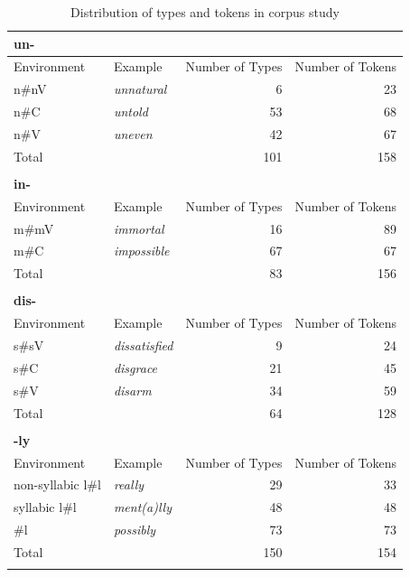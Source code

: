 \begin{table}
	\caption{Distribution of types and tokens in corpus study}
	\label{tbl:distribution of types and tokens in corpus}
	
		
		\begin{tabular} {llrr}
				\lsptoprule	
			\textbf{un-}&&&\\
						\midrule   	
			Environment & Example & Number of Types & Number of Tokens\\
			\midrule
			n\#nV&\color{lsMidBlue}\textit{unnatural} & 6 & 23\\ 
			n\#C&\color{lsMidBlue}\textit{untold} & 53 & 68\\ 
			n\#V&\color{lsMidBlue}\textit{uneven} & 42 & 67\\
			\midrule
			Total&  & 101 & 158\\ 
			\midrule
			\\
			\textbf{in-}&&&\\
						\midrule   	
			Environment & Example & Number of Types & Number of Tokens\\
			\midrule
			m\#mV&\color{lsMidBlue}\textit{immortal} & 16 & 89\\ 
			m\#C&\color{lsMidBlue}\textit{impossible} & 67 & 67\\ 
			\midrule   
			Total&  & 83 & 156\\ 
			\midrule     	
			\\
			\textbf{dis-}&&&\\
									\midrule   	
			Environment & Example & Number of Types & Number of Tokens\\
			\midrule
			s\#sV&\color{lsMidBlue}\textit{dissatisfied} & 9 & 24\\ 
			s\#C&\color{lsMidBlue}\textit{disgrace} & 21 & 45\\ 
			s\#V&\color{lsMidBlue}\textit{disarm} & 34 & 59\\ 
			\midrule   	
			Total&  & 64 & 128\\ 
			\midrule   	
			\\
			\textbf{-ly}&&&\\
						\midrule   	
			Environment & Example & Number of Types & Number of Tokens\\
			\midrule
			non-\is{syllabicity}syllabic l\#l &\color{lsMidBlue}\textit{really} & 29  & 33 \\ 
			\is{syllabicity}syllabic 	l\#l &\color{lsMidBlue}\textit{ment(a)lly} & 48 & 48 \\ 
			\#l &\color{lsMidBlue}\textit{possibly} & 73 & 73\\ 
			\midrule   	
			Total&  & 150  & 154\\ 
			\lspbottomrule                                                                                
		\end{tabular}
		
	
\end{table}
